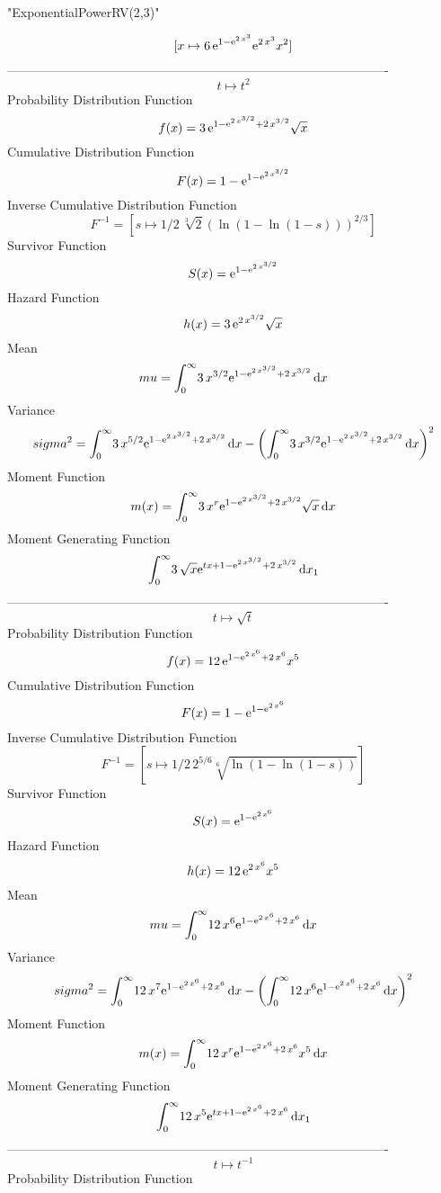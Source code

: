 \documentclass[12pt]{article}
\begin{document}
 
                          "ExponentialPowerRV(2,3)"

$$[x\mapsto 6\,{{\rm e}^{1-{{\rm e}^{2\,{x}^{3}}}}}{{\rm e}^{2\,{x}^{3}}
}{x}^{2}]
$$-------------------------------------------------------------------------------------------  \\$$t\mapsto {t}^{2}
$$Probability Distribution Function 
$$  f(x)=3\,{{\rm e}^{1-{{\rm e}^{2\,{x}^{3/2}}}+2\,{x}^{3/2}}}\sqrt {x}
$$Cumulative Distribution Function  
 $$F(x)=1-{{\rm e}^{1-{{\rm e}^{2\,{x}^{3/2}}}}}
$$ Inverse Cumulative Distribution Function 
  $$F^{-1} = [s\mapsto 1/2\,\sqrt [3]{2} \left( \ln  \left( 1-\ln  \left( 1-s
 \right)  \right)  \right) ^{2/3}]
$$Survivor Function 
 $$ S(x)={{\rm e}^{1-{{\rm e}^{2\,{x}^{3/2}}}}}
$$ Hazard Function 
 $$ h(x)=3\,{{\rm e}^{2\,{x}^{3/2}}}\sqrt {x}
$$Mean 
 $$ mu=\int_{0}^{\infty }\!3\,{x}^{3/2}{{\rm e}^{1-{{\rm e}^{2\,{x}^{3/2}}}+2
\,{x}^{3/2}}}\,{\rm d}x
$$ Variance 
 $$ sigma^2 = \int_{0}^{\infty }\!3\,{x}^{5/2}{{\rm e}^{1-{{\rm e}^{2\,{x}^{3/2}}}+2
\,{x}^{3/2}}}\,{\rm d}x- \left( \int_{0}^{\infty }\!3\,{x}^{3/2}{
{\rm e}^{1-{{\rm e}^{2\,{x}^{3/2}}}+2\,{x}^{3/2}}}\,{\rm d}x \right) ^
{2}
$$Moment Function 
 $$ m(x) = \int_{0}^{\infty }\!3\,{x}^{r}{{\rm e}^{1-{{\rm e}^{2\,{x}^{3/2}}}+2\,
{x}^{3/2}}}\sqrt {x}\,{\rm d}x
$$ Moment Generating Function 
 $$\int_{0}^{\infty }\!3\,\sqrt {x}{{\rm e}^{tx+1-{{\rm e}^{2\,{x}^{3/2}}
}+2\,{x}^{3/2}}}\,{\rm d}x_{{1}}
$$-------------------------------------------------------------------------------------------  \\$$t\mapsto \sqrt {t}
$$Probability Distribution Function 
$$  f(x)=12\,{{\rm e}^{1-{{\rm e}^{2\,{x}^{6}}}+2\,{x}^{6}}}{x}^{5}
$$Cumulative Distribution Function  
 $$F(x)=1-{{\rm e}^{1-{{\rm e}^{2\,{x}^{6}}}}}
$$ Inverse Cumulative Distribution Function 
  $$F^{-1} = [s\mapsto 1/2\,{2}^{5/6}\sqrt [6]{\ln  \left( 1-\ln  \left( 1-s
 \right)  \right) }]
$$Survivor Function 
 $$ S(x)={{\rm e}^{1-{{\rm e}^{2\,{x}^{6}}}}}
$$ Hazard Function 
 $$ h(x)=12\,{{\rm e}^{2\,{x}^{6}}}{x}^{5}
$$Mean 
 $$ mu=\int_{0}^{\infty }\!12\,{x}^{6}{{\rm e}^{1-{{\rm e}^{2\,{x}^{6}}}+2\,{
x}^{6}}}\,{\rm d}x
$$ Variance 
 $$ sigma^2 = \int_{0}^{\infty }\!12\,{x}^{7}{{\rm e}^{1-{{\rm e}^{2\,{x}^{6}}}+2\,{
x}^{6}}}\,{\rm d}x- \left( \int_{0}^{\infty }\!12\,{x}^{6}{{\rm e}^{1-
{{\rm e}^{2\,{x}^{6}}}+2\,{x}^{6}}}\,{\rm d}x \right) ^{2}
$$Moment Function 
 $$ m(x) = \int_{0}^{\infty }\!12\,{x}^{r}{{\rm e}^{1-{{\rm e}^{2\,{x}^{6}}}+2\,{
x}^{6}}}{x}^{5}\,{\rm d}x
$$ Moment Generating Function 
 $$\int_{0}^{\infty }\!12\,{x}^{5}{{\rm e}^{tx+1-{{\rm e}^{2\,{x}^{6}}}+2
\,{x}^{6}}}\,{\rm d}x_{{1}}
$$-------------------------------------------------------------------------------------------  \\$$t\mapsto {t}^{-1}
$$Probability Distribution Function 
\end{document}
